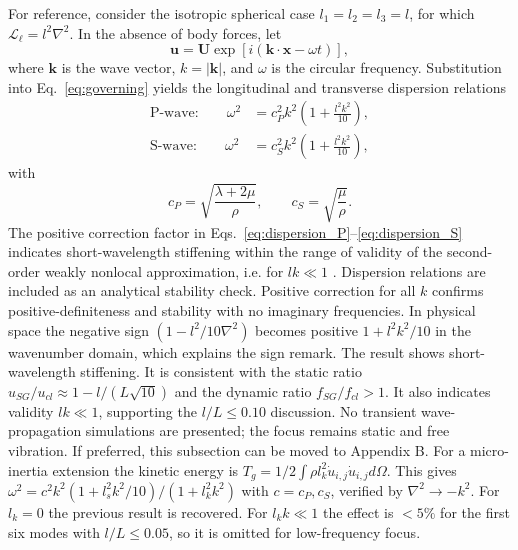 \documentclass[final,3p,times,fleqn]{elsarticle}
\newcommand{\rev}[1]{\textcolor{revcolor}{#1}}
\begin{document}
For reference, consider the isotropic spherical case
$l_1=l_2=l_3=l$, for which
$\mathcal{L}_{\ell}=l^2\nabla^2$. In the absence of body forces, let
\begin{equation}\label{eq:plane_wave}
\mathbf{u}
=
\mathbf{U}\exp\left[i(\mathbf{k}\cdot\mathbf{x}-\omega t)\right],
\end{equation}
where $\mathbf{k}$ is the wave vector, $k=|\mathbf{k}|$, and $\omega$ is
the circular frequency. Substitution into Eq.~\eqref{eq:governing}
yields the longitudinal and transverse dispersion relations
\begin{align}
\text{P-wave:}\qquad
\omega^2
&=
c_P^2 k^2
\left(
1+\frac{l^2 k^2}{10}
\right),
\label{eq:dispersion_P}
\\
\text{S-wave:}\qquad
\omega^2
&=
c_S^2 k^2
\left(
1+\frac{l^2 k^2}{10}
\right),
\label{eq:dispersion_S}
\end{align}
with
\begin{equation}\label{eq:wave_speeds}
c_P
=
\sqrt{\frac{\lambda+2\mu}{\rho}},
\qquad
c_S
=
\sqrt{\frac{\mu}{\rho}}.
\end{equation}
The positive correction factor in
Eqs.~\eqref{eq:dispersion_P}--\eqref{eq:dispersion_S} indicates
short-wavelength stiffening within the range of validity of the
second-order weakly nonlocal approximation, i.e. for $lk\ll1$
\cite{MetrikineAskes2002,AskesAifantis2011}.
\rev{Dispersion relations are included as an analytical stability check. Positive correction for all $k$ confirms positive-definiteness and stability with no imaginary frequencies. In physical space the negative sign $(1- l^2/10\nabla^2)$ becomes positive $1+ l^2k^2/10$ in the wavenumber domain, which explains the sign remark. The result shows short-wavelength stiffening. It is consistent with the static ratio $u_{SG}/u_{cl}\approx1- l/(L\sqrt{10})$ and the dynamic ratio $f_{SG}/f_{cl}>1$. It also indicates validity $lk\ll1$, supporting the $l/L\le0.10$ discussion. No transient wave-propagation simulations are presented; the focus remains static and free vibration. If preferred, this subsection can be moved to Appendix B. For a micro-inertia extension the kinetic energy is $T_g=1/2\int\rho l_k^2\dot{u}_{i,j}\dot{u}_{i,j}d\Omega$. This gives $\omega^2=c^2k^2(1+l_s^2k^2/10)/(1+l_k^2k^2)$ with $c=c_P,c_S$, verified by $\nabla^2\rightarrow -k^2$. For $l_k=0$ the previous result is recovered. For $l_kk\ll1$ the effect is $<5\%$ for the first six modes with $l/L\le0.05$, so it is omitted for low-frequency focus.}

\end{document}
